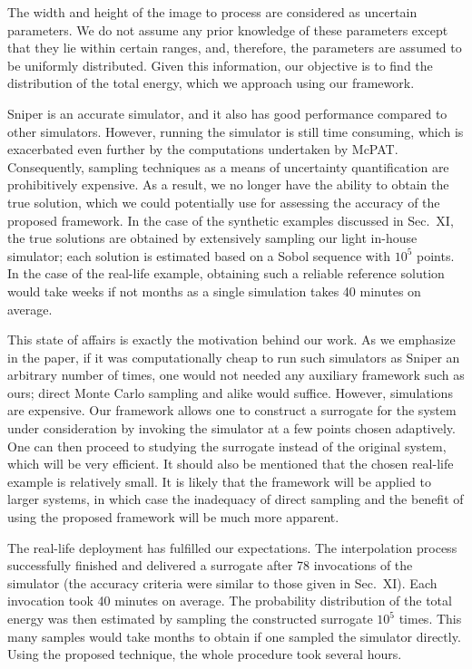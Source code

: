 \begin{authors}
The width and height of the image to process are considered as uncertain
parameters. We do not assume any prior knowledge of these parameters except that
they lie within certain ranges, and, therefore, the parameters are assumed to be
uniformly distributed. Given this information, our objective is to find the
distribution of the total energy, which we approach using our framework.

Sniper is an accurate simulator, and it also has good performance compared to
other simulators. However, running the simulator is still time consuming, which
is exacerbated even further by the computations undertaken by McPAT.
Consequently, sampling techniques as a means of uncertainty quantification are
prohibitively expensive. As a result, we no longer have the ability to obtain
the true solution, which we could potentially use for assessing the accuracy of
the proposed framework. In the case of the synthetic examples discussed in
Sec.~XI, the true solutions are obtained by extensively sampling our light
in-house simulator; each solution is estimated based on a Sobol sequence with
$10^5$ points. In the case of the real-life example, obtaining such a reliable
reference solution would take weeks if not months as a single simulation takes
40 minutes on average.

This state of affairs is exactly the motivation behind our work. As we emphasize
in the paper, if it was computationally cheap to run such simulators as Sniper
an arbitrary number of times, one would not needed any auxiliary framework such
as ours; direct Monte Carlo sampling and alike would suffice. However,
simulations are expensive. Our framework allows one to construct a surrogate for
the system under consideration by invoking the simulator at a few points chosen
adaptively. One can then proceed to studying the surrogate instead of the
original system, which will be very efficient. It should also be mentioned that
the chosen real-life example is relatively small. It is likely that the
framework will be applied to larger systems, in which case the inadequacy of
direct sampling and the benefit of using the proposed framework will be much
more apparent.

The real-life deployment has fulfilled our expectations. The interpolation
process successfully finished and delivered a surrogate after 78 invocations of
the simulator (the accuracy criteria were similar to those given in Sec.~XI).
Each invocation took 40 minutes on average. The probability distribution of the
total energy was then estimated by sampling the constructed surrogate $10^5$
times. This many samples would take months to obtain if one sampled the
simulator directly. Using the proposed technique, the whole procedure took
several hours.


\end{authors}
